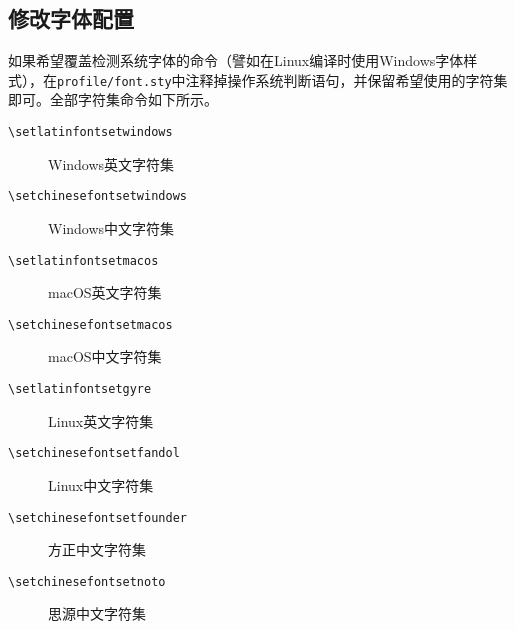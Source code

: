 \subsection{修改字体配置}

如果希望覆盖检测系统字体的命令（譬如在Linux编译时使用Windows字体样式），在\texttt{profile/font.sty}中注释掉操作系统判断语句，并保留希望使用的字符集即可。全部字符集命令如下所示。

\begin{description}
    \item[\texttt{\textbackslash set\textunderscore latin\textunderscore fontset\textunderscore windows}] Windows英文字符集
    \item[\texttt{\textbackslash set\textunderscore chinese\textunderscore fontset\textunderscore windows}] Windows中文字符集
    \item[\texttt{\textbackslash set\textunderscore latin\textunderscore fontset\textunderscore macos}] macOS英文字符集
    \item[\texttt{\textbackslash set\textunderscore chinese\textunderscore fontset\textunderscore macos}] macOS中文字符集
    \item[\texttt{\textbackslash set\textunderscore latin\textunderscore fontset\textunderscore gyre}] Linux英文字符集
    \item[\texttt{\textbackslash set\textunderscore chinese\textunderscore fontset\textunderscore fandol}] Linux中文字符集
    \item[\texttt{\textbackslash set\textunderscore chinese\textunderscore fontset\textunderscore founder}] 方正中文字符集
    \item[\texttt{\textbackslash set\textunderscore chinese\textunderscore fontset\textunderscore noto}] 思源中文字符集
\end{description}
